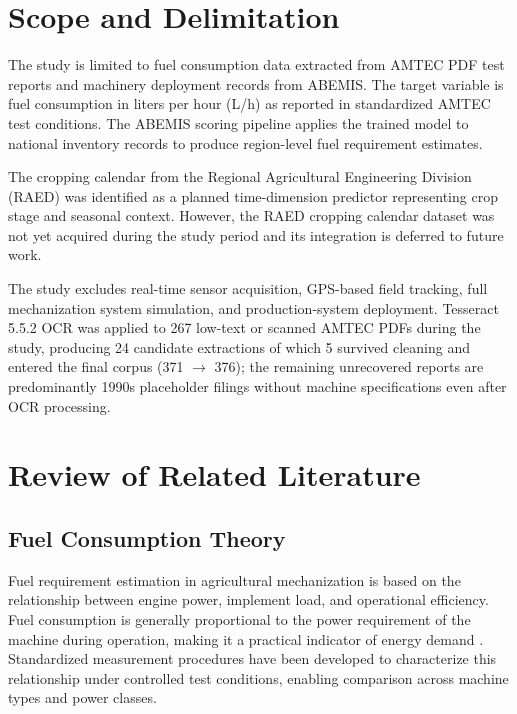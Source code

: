 \documentclass[conference]{IEEEtran}
\begin{document}
\section{Scope and Delimitation}

The study is limited to fuel consumption data extracted from AMTEC PDF test reports and machinery deployment records from ABEMIS. The target variable is fuel consumption in liters per hour (L/h) as reported in standardized AMTEC test conditions. The ABEMIS scoring pipeline applies the trained model to national inventory records to produce region-level fuel requirement estimates.

The cropping calendar from the Regional Agricultural Engineering Division (RAED) was identified as a planned time-dimension predictor representing crop stage and seasonal context. However, the RAED cropping calendar dataset was not yet acquired during the study period and its integration is deferred to future work.

The study excludes real-time sensor acquisition, GPS-based field tracking, full mechanization system simulation, and production-system deployment. Tesseract 5.5.2 OCR was applied to 267 low-text or scanned AMTEC PDFs during the study, producing 24 candidate extractions of which 5 survived cleaning and entered the final corpus (371 $\rightarrow$ 376); the remaining unrecovered reports are predominantly 1990s placeholder filings without machine specifications even after OCR processing.

\section{Review of Related Literature}

\subsection{Fuel Consumption Theory}

Fuel requirement estimation in agricultural mechanization is based on the relationship between engine power, implement load, and operational efficiency. Fuel consumption is generally proportional to the power requirement of the machine during operation, making it a practical indicator of energy demand \cite{domsch1999fuel}. Standardized measurement procedures have been developed to characterize this relationship under controlled test conditions, enabling comparison across machine types and power classes.
\end{document}
